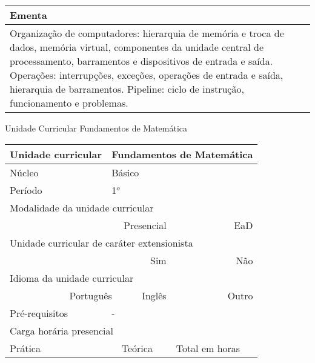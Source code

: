 \begin{quadro}[ht!]
\begin{tabular}{|p{3cm} p{2cm} p{3cm} p{2cm} p{3cm} p{2cm}|}
\multicolumn{6}{|p{15cm}|}{\cellcolor{blue1} Ementa} \\\hline
\hline\multicolumn{6}{|p{15cm}|}{\scriptsize Organização de computadores: hierarquia de memória e troca de dados, memória virtual, componentes da unidade central de processamento, barramentos e dispositivos de entrada e saída. Operações: interrupções, exceções, operações de entrada e saída, hierarquia de barramentos. Pipeline: ciclo de instrução, funcionamento e problemas.}\\\hline
\hline
	\end{tabular}
\end{quadro}
\begin{quadro}[ht!]
  \centering\scriptsize
\caption{Unidade Curricular Fundamentos de Matemática}
\label{ unit_3 }
\begin{tabular}{|p{3cm} p{2cm} p{3cm} p{2cm} p{3cm} p{2cm}|}\hline
\multicolumn{1}{|p{3cm}|}{\cellcolor{blue1} Unidade curricular} & \multicolumn{5}{p{9cm}|}{ Fundamentos de Matemática }\\\hline
\multicolumn{1}{|p{3cm}|}{\cellcolor{blue1} Núcleo} & \multicolumn{5}{p{11.5cm}|}{ Básico }\\\hline
\multicolumn{1}{|p{3cm}|}{\cellcolor{blue1} Período} & \multicolumn{5}{p{9cm}|}{ 1$^o$ }\\\hline
\multicolumn{6}{|p{15cm}|}{\cellcolor{blue1} Modalidade da unidade curricular} \\\hline
\multicolumn{2}{|r}{		} &  \multicolumn{2}{r}{Presencial \XBox } & \multicolumn{2}{r|}{EaD \Square	} \\\hline
\multicolumn{6}{|p{15cm}|}{\cellcolor{blue1} Unidade curricular de caráter extensionista} \\\hline
\multicolumn{4}{|r}{			Sim \Square	} & \multicolumn{2}{r|}{	Não \XBox	}\\\hline
\multicolumn{6}{|p{15cm}|}{\cellcolor{blue1} Idioma da unidade curricular} \\ \hline
\multicolumn{2}{|r}{	Português \XBox	} &  \multicolumn{2}{r}{	Inglês \Square	} & \multicolumn{2}{r|}{	Outro \Square	} \\ \hline
\multicolumn{1}{|p{3cm}|}{\cellcolor{blue1} Pré-requisitos} & \multicolumn{5}{p{9cm}|}{ - }\\ \hline
\multicolumn{6}{|p{15cm}|}{\cellcolor{blue1} Carga horária presencial} \\ \hline
\multicolumn{1}{|p{3cm}|}{\raggedleft Prática} & \multicolumn{1}{p{1cm}|}{\centering	30	} &  \multicolumn{1}{p{3cm}|}{\raggedleft Teórica}  & \multicolumn{1}{p{1cm}|}{\centering 	30 } & \multicolumn{1}{p{3cm}|}{\raggedleft Total em horas} & \multicolumn{1}{p{1cm}|}{\raggedleft	60	} \\ \hline

\end{tabular}
\end{quadro}
